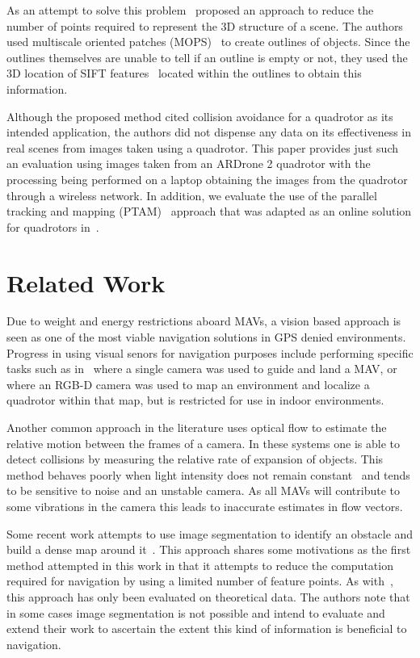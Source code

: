 \documentclass{acmsiggraph}
\begin{document}
As an attempt to solve this problem~\cite{lee2011} proposed an approach to reduce the number of points required to 
represent the 3D structure of a scene.  The authors used multiscale oriented patches (MOPS)~\cite{BSW05} to create outlines of 
objects.  Since the outlines themselves are unable to tell if an outline is empty or not, they used the 3D location of SIFT 
features~\cite{lowe2004} located within the outlines to obtain this information.  

Although the proposed method cited collision avoidance for a quadrotor as its intended application, the authors did not 
dispense any data on its effectiveness in real scenes from images taken using a quadrotor.  This paper provides just such an 
evaluation using images taken from an ARDrone 2 quadrotor with the processing being performed on a laptop obtaining the 
images from the quadrotor through a wireless network. In addition, we evaluate the use of the parallel tracking and 
mapping (PTAM)~\cite{klein07parallel} approach that was adapted as an online solution for quadrotors in~\cite{weiss2011}.

\section{Related Work}
Due to weight and energy restrictions aboard MAVs, a vision based approach is seen as one of the most viable navigation 
solutions in GPS denied environments.  Progress in using visual senors for navigation purposes include performing specific 
tasks such as in~\cite{johnson2005} where a single camera was used to guide and land a MAV, or~\cite{huang2011isrr} where an 
RGB-D camera was used to map an environment and localize a quadrotor within that map, but is restricted for use in indoor
environments.

Another common approach in the literature uses optical flow to estimate the relative motion between the frames of a camera.
In these systems one is able to detect collisions by measuring the relative rate of expansion of objects.  This method 
behaves poorly when light intensity does not remain constant~\cite{horn1981} and tends to be sensitive to noise and
an unstable camera.  As all MAVs will contribute to some vibrations in the camera this leads to inaccurate estimates in
flow vectors.

Some recent work attempts to use image segmentation to identify an obstacle and build a dense map around it~\cite{ha2012}.  
This approach shares some motivations as the first method attempted in this work in that it attempts to reduce the computation required for navigation by using a limited number of feature points.  As with~\cite{lee2011}, this approach
has only been evaluated on theoretical data.  The authors note that in some cases image segmentation is not possible and 
intend to evaluate and extend their work to ascertain the extent this kind of information is beneficial to navigation.
\end{document}
